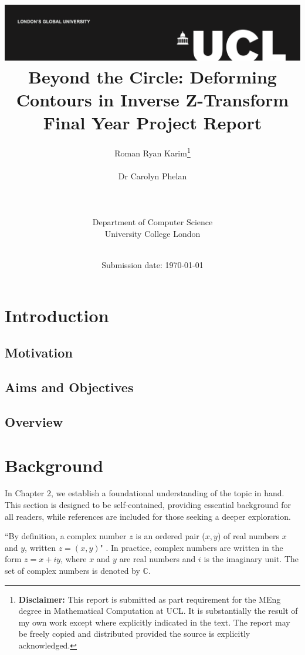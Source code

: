 \documentclass[a4paper]{report}
\title{{\vspace{-14em} \includegraphics[scale=0.4]{Logos/ucl_logo.png}}\\
{{\vspace{2em} \Huge Beyond the Circle: Deforming Contours in Inverse Z-Transform}}\\
{\large Final Year Project Report}\\
}
\date{Submission date: \today}
\author{Roman Ryan Karim\thanks{
{\bf Disclaimer:}
This report is submitted as part requirement for the MEng degree in Mathematical Computation at UCL. It is substantially the result of my own work except where explicitly indicated in the text. The report may be freely copied and distributed provided the source is explicitly acknowledged.}
\\ \\ Dr Carolyn Phelan
\\ \\ \\ \\ Department of Computer Science
\\ University College London
\\ \\
}
\begin{document}
 
\onehalfspacing
\maketitle
\begin{abstract}

\end{abstract}

\tableofcontents
\setcounter{page}{1}

\listoftodos

\chapter{Introduction}
\section{Motivation}

\section{Aims and Objectives}

\section{Overview}

\chapter{Background}

In Chapter 2, we establish a foundational understanding of the topic in hand. This section is designed to be self-contained, providing essential background for all readers, while references are included for those seeking a deeper exploration.

``By definition, a complex number $z$ is an ordered pair ($x, y$) of real numbers $x$ and $y$, written $z = (x, y)$" \citep{kreyszig2010advanced}. In practice, complex numbers are written in the form $z = x + iy$, where $x$ and $y$ are real numbers and $i$ is the imaginary unit. The set of complex numbers is denoted by $\mathbb{C}$.
\end{document}
